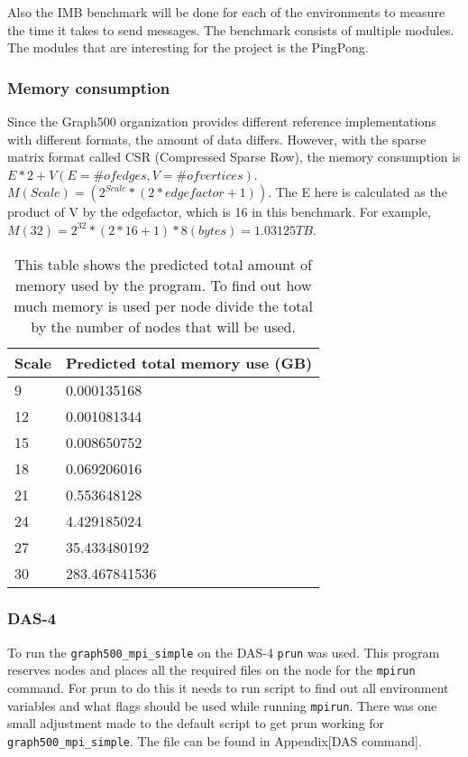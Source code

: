 Also the IMB benchmark will be done for each of the environments to measure the time it takes to send messages. The benchmark consists of multiple modules. The modules that are interesting for the project is the PingPong. 

\subsubsection{Memory consumption}
Since the Graph500 organization provides different reference implementations with different formats, the amount of data differs. However, with the sparse matrix format called CSR (Compressed Sparse Row), the memory consumption is $E*2 + V (E = \# of edges, V = \# of vertices)$.
$M(Scale) = (2^{Scale} *(2*edgefactor + 1))$. The E here is calculated as the product of V by the edgefactor, which is 16 in this benchmark. For
example, $M(32) = 2^{32} * (2*16+1) * 8 (bytes) = 1.03125 TB$.
\begin{table} [!h]
\begin{center}
\begin{tabular}{|l|l|}
\hline
Scale & Predicted total memory use (GB) \\ \hline
9 &  0.000135168 \\ \hline
12 & 0.001081344 \\ \hline
15 & 0.008650752 \\ \hline
18 & 0.069206016 \\ \hline
21 & 0.553648128 \\ \hline
24 & 4.429185024 \\ \hline
27 & 35.433480192 \\ \hline
30 & 283.467841536 \\ \hline


\end{tabular}
\end{center}

\caption{This table shows the predicted total amount of memory used by the program. To find out how much memory is used per node divide the total by the number of nodes that will be used.}
\label{tab:calculation memory consumption}
\end{table}
    
    
\subsubsection{DAS-4}
To run the \texttt{graph500\_mpi\_simple} on the DAS-4 \texttt{prun} was used. This program reserves nodes and places all the required files on the node for the \texttt{mpirun} command. For prun to do this it needs to run script to find out all environment variables and what flags should be used while running \texttt{mpirun}. There was one small adjustment made to the default script to get prun working for \texttt{graph500\_mpi\_simple}. The file can be found in Appendix[DAS command].


